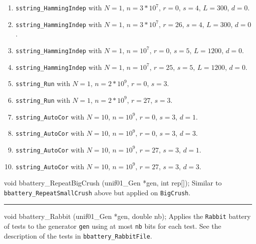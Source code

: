 \begin{enumerate}
  \item {\tt sstring\_HammingIndep} with $N=1$, $n=3*10^7$, $r=0$,
   $s=4$, $L=300$, $d=0$.

  \item {\tt sstring\_HammingIndep} with $N=1$, $n=3*10^7$, $r=26$,
   $s=4$, $L=300$, $d=0$.

  \item {\tt sstring\_HammingIndep} with $N=1$, $n=10^7$, $r=0$,
   $s=5$, $L=1200$, $d=0$.

  \item {\tt sstring\_HammingIndep} with $N=1$, $n=10^7$, $r=25$,
   $s=5$, $L=1200$, $d=0$.

  \item {\tt sstring\_Run}  with $N=1$, $n=2*10^9$, $r=0$, $s=3$.

  \item {\tt sstring\_Run}  with $N=1$, $n=2*10^9$, $r=27$, $s=3$.

  \item {\tt sstring\_AutoCor} with $N=10$, $n=10^9$, $r=0$, $s=3$,
   $d=1$.

  \item {\tt sstring\_AutoCor} with $N=10$, $n=10^9$, $r=0$, $s=3$,
   $d=3$.

  \item {\tt sstring\_AutoCor} with $N=10$, $n=10^9$, $r=27$, $s=3$,
   $d=1$.

  \item {\tt sstring\_AutoCor} with $N=10$, $n=10^9$, $r=27$, $s=3$,
   $d=3$.

\end{enumerate}

\code


void bbattery_RepeatBigCrush (unif01_Gen *gen, int rep[]);
\endcode
  \tab Similar to {\tt bbattery\_RepeatSmallCrush} above but applied on
  {\tt BigCrush}.
  \endtab
\bigskip


\bigskip
\hrule
\code


void bbattery_Rabbit (unif01_Gen *gen, double nb);
\endcode
  \tab Applies the {\tt Rabbit} battery of tests to the generator {\tt gen}
   using at most {\tt nb} bits for each test. See the description of the
   tests in {\tt bbattery\_RabbitFile}.
  \endtab
\code

